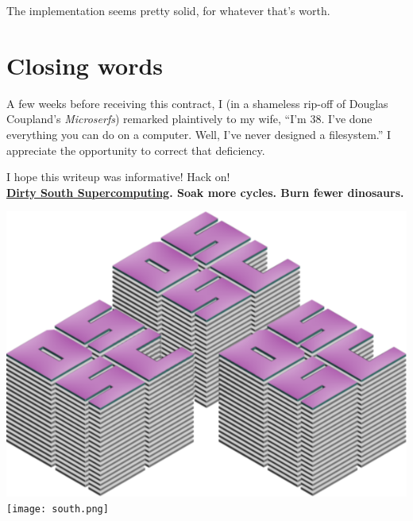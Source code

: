 \documentclass[letterpaper,10pt]{article}
\begin{document}
The implementation seems pretty solid, for whatever that's worth.

\section{Closing words}
A few weeks before receiving this contract, I (in a shameless rip-off of Douglas
Coupland's \textit{Microserfs}\parencite{microserfs}) remarked plaintively to
my wife, ``I'm 38. I've done everything you can do on a computer. Well, I've
never designed a filesystem.'' I appreciate the opportunity to correct that
deficiency.

I hope this writeup was informative! Hack on!\\

\textbf{\href{https://www.dsscaw.com/}{Dirty South Supercomputing}. Soak more cycles. Burn fewer dinosaurs.}
\vspace{1cm}

\printbibliography
\vfill
\begin{minipage}{\textwidth}
\begin{center}
\includegraphics[width=.4\linewidth]{../dsscaw-purp-scaled.png}
\texttt{[image: south.png]}
\end{center}
\end{minipage}
\end{document}
